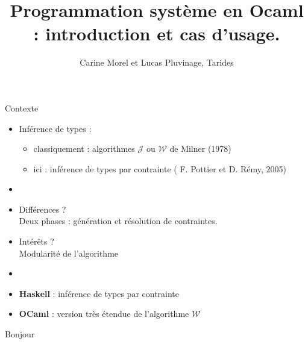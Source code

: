 \documentclass{beamer}
\title{Programmation système en Ocaml : introduction et cas d'usage.}
\author{Carine Morel et Lucas Pluvinage, Tarides}
\newcommand{\subtt}[1]{\textcolor{gray!30!cyan}{#1}}
\begin{document}
\maketitle


\begin{frame}{Contexte}
  \begin{itemize}
  \item<1-> Inférence de types :
    \begin{itemize}[label=$-$]
    \item classiquement : algorithmes $\mathcal{J}$ ou $\mathcal{W}$ de Milner (1978)
    \item ici : inférence de types par contrainte ( F. Pottier et D. Rémy, 2005)
    \end{itemize}
  \item<2->
  \item<2-> \subtt{Différences ?} \\
    Deux phases :  génération et résolution de contraintes.
  \item<2-> \subtt{Intérêts ?} \\Modularité de l'algorithme

  \item<3->
  \item<3-> \textbf{Haskell} : inférence de types par contrainte
  \item<3-> \textbf{OCaml} : version très étendue de l'algorithme $\mathcal{W}$
  \end{itemize}

\end{frame}

\begin{frame}{Bonjour}
    

    
\end{frame}
\end{document}
